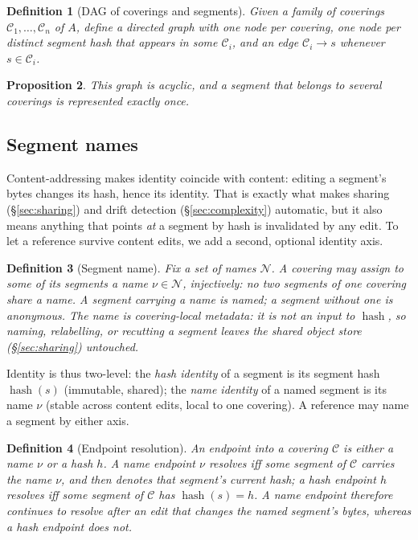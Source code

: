 \documentclass[11pt,a4paper]{article}
\newtheorem{definition}{Definition}[section]
\newtheorem{proposition}[definition]{Proposition}
\DeclareMathOperator{\hash}{hash}
\newcommand{\Cov}{\mathcal{C}}
\begin{document}
\begin{definition}[DAG of coverings and segments]\label{def:dag}
Given a family of coverings $\Cov_1, \dots, \Cov_n$ of $A$, define a
directed graph with one node per covering, one node per distinct
segment hash that appears in some $\Cov_i$, and an edge $\Cov_i \to s$
whenever $s \in \Cov_i$.
\end{definition}

\begin{proposition}\label{prop:dag-acyclic}
This graph is acyclic, and a segment that belongs to several
coverings is represented exactly once.
\end{proposition}

\subsection{Segment names}\label{sec:segment-names}

Content-addressing makes identity coincide with content: editing a
segment's bytes changes its hash, hence its identity. That is exactly
what makes sharing (\S\ref{sec:sharing}) and drift detection
(\S\ref{sec:complexity}) automatic, but it also means anything that
points \emph{at} a segment by hash is invalidated by any edit. To let a
reference survive content edits, we add a second, optional identity
axis.

\begin{definition}[Segment name]\label{def:segment-name}
Fix a set of \emph{names} $\mathcal{N}$. A covering may assign to some
of its segments a \emph{name} $\nu \in \mathcal{N}$, injectively: no two
segments of one covering share a name. A segment carrying a name is
\emph{named}; a segment without one is \emph{anonymous}. The name is
covering-local metadata: it is \emph{not} an input to $\hash$, so
naming, relabelling, or recutting a segment leaves the shared object
store (\S\ref{sec:sharing}) untouched.
\end{definition}

Identity is thus two-level: the \emph{hash identity} of a segment is its
segment hash $\hash(s)$ (immutable, shared); the \emph{name identity} of
a named segment is its name $\nu$ (stable across content edits, local to
one covering). A reference may name a segment by either axis.

\begin{definition}[Endpoint resolution]\label{def:endpoint}
An \emph{endpoint} into a covering $\Cov$ is either a name $\nu$ or a
hash $h$. A name endpoint $\nu$ \emph{resolves} iff some segment of
$\Cov$ carries the name $\nu$, and then denotes that segment's current
hash; a hash endpoint $h$ resolves iff some segment of $\Cov$ has
$\hash(s) = h$. A name endpoint therefore continues to resolve after an
edit that changes the named segment's bytes, whereas a hash endpoint
does not.
\end{definition}
\end{document}

